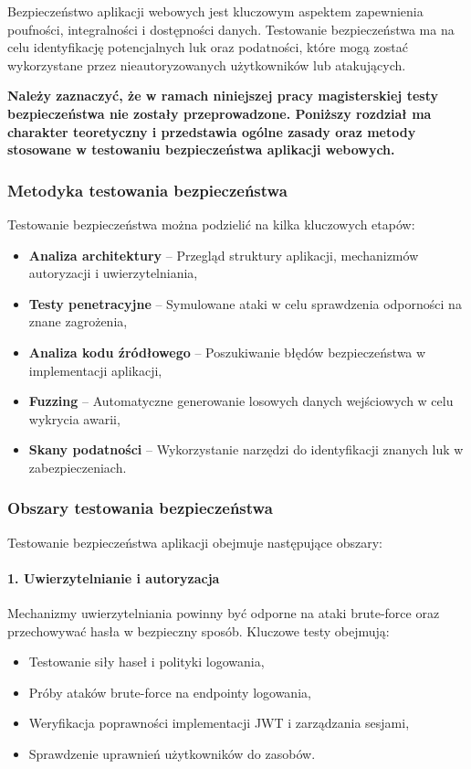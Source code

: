 Bezpieczeństwo aplikacji webowych jest kluczowym aspektem zapewnienia poufności, integralności i dostępności danych. Testowanie bezpieczeństwa ma na celu identyfikację potencjalnych luk oraz podatności, które mogą zostać wykorzystane przez nieautoryzowanych użytkowników lub atakujących.

\textbf{Należy zaznaczyć, że w ramach niniejszej pracy magisterskiej testy bezpieczeństwa nie zostały przeprowadzone. Poniższy rozdział ma charakter teoretyczny i przedstawia ogólne zasady oraz metody stosowane w testowaniu bezpieczeństwa aplikacji webowych.}

\subsubsection{Metodyka testowania bezpieczeństwa}
Testowanie bezpieczeństwa można podzielić na kilka kluczowych etapów:
\begin{itemize}
    \item \textbf{Analiza architektury} – Przegląd struktury aplikacji, mechanizmów autoryzacji i uwierzytelniania,
    \item \textbf{Testy penetracyjne} – Symulowane ataki w celu sprawdzenia odporności na znane zagrożenia,
    \item \textbf{Analiza kodu źródłowego} – Poszukiwanie błędów bezpieczeństwa w implementacji aplikacji,
    \item \textbf{Fuzzing} – Automatyczne generowanie losowych danych wejściowych w celu wykrycia awarii,
    \item \textbf{Skany podatności} – Wykorzystanie narzędzi do identyfikacji znanych luk w zabezpieczeniach.
\end{itemize}

\subsubsection{Obszary testowania bezpieczeństwa}
Testowanie bezpieczeństwa aplikacji obejmuje następujące obszary:

\paragraph{1. Uwierzytelnianie i autoryzacja}
Mechanizmy uwierzytelniania powinny być odporne na ataki brute-force oraz przechowywać hasła w bezpieczny sposób. Kluczowe testy obejmują:
\begin{itemize}
    \item Testowanie siły haseł i polityki logowania,
    \item Próby ataków brute-force na endpointy logowania,
    \item Weryfikacja poprawności implementacji JWT i zarządzania sesjami,
    \item Sprawdzenie uprawnień użytkowników do zasobów.
\end{itemize}

